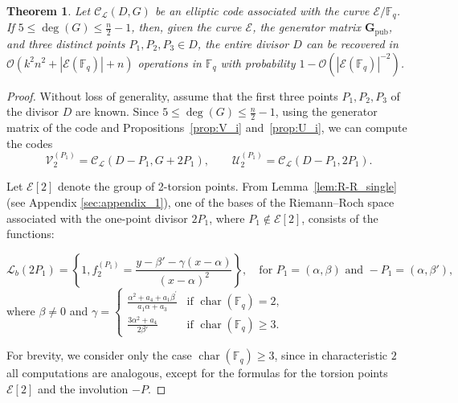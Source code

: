 \documentclass[sn-mathphys-num]{sn-jnl_modified}
\newcommand{\FF}{\ensuremath{\mathbb{F}}}
\newtheorem{theorem}{Theorem}[subsection]
\begin{document}
\begin{theorem}\label{th:my_attack_D}
Let $\mathcal{C}_\mathscr{L}(D, G)$ be an elliptic code associated with the curve $\mathcal{E}/\mathbb{F}_q$. If $5 \leq \deg(G) \leq \frac{n}{2}-1$, then, given the curve $\mathcal{E}$, the generator matrix $\mathbf{G}_{\operatorname{pub}}$, and three distinct points $P_1, P_2, P_3 \in D$, the entire divisor $D$ can be recovered in $\mathcal{O}\!\left(k^2n^2 + |\mathcal{E}(\mathbb{F}_q)| + n\right)$ operations in $\mathbb{F}_q$ with probability $1-\mathcal{O}\!\left(|\mathcal{E}(\FF_q)|^{-2}\right)$. 
\end{theorem}
\begin{proof}
Without loss of generality, assume that the first three points $P_1, P_2, P_3$ of the divisor $D$ are known. Since $5 \leq \deg(G) \leq \frac{n}{2}-1$, using the generator matrix of the code and Propositions~\ref{prop:V_i} and~\ref{prop:U_i}, we can compute the codes
\begin{equation}\label{eq:V2U2}
\mathcal{V}_2^{(P_1)} = \mathcal{C}_\mathscr{L}(D - P_1, G + 2P_1), \quad \quad \mathcal{U}_2^{(P_1)} = \mathcal{C}_\mathscr{L}(D - P_1, 2P_1).
\end{equation}

Let $\mathcal{E}[2]$ denote the group of 2-torsion points. From Lemma~\ref{lem:R-R_single} (see Appendix \ref{sec:appendix_1}), one of the bases of the Riemann--Roch space associated with the one-point divisor $2P_1$, where $P_1 \not\in \mathcal{E}[2]$, consists of the functions:


\begin{equation}\label{eq:U2_basis}
    \mathscr{L}_b(2P_1) = \left\{1, f_2^{(P_1)} = \frac{y - \beta' - \gamma(x - \alpha)}{(x-\alpha)^2}\right\}, \quad \text{for } P_1 = (\alpha, \beta) \text{ and } -P_1 = (\alpha, \beta'),
\end{equation}
where $\beta \neq 0$ and $\gamma = \begin{cases}
\frac{\alpha^2 + a_4 + a_1\beta^\prime}{a_1\alpha + a_3} & \text{if } \operatorname{char}(\mathbb{F}_q) = 2,\\[1.2ex]
\frac{3\alpha^2 + a_4}{2\beta'} & \text{if } \operatorname{char}(\mathbb{F}_q) \geq 3.
\end{cases}$

For brevity, we consider only the case $\operatorname{char}(\mathbb{F}_q) \geq 3$, since in characteristic $2$ all computations are analogous, except for the formulas for the torsion points $\mathcal{E}[2]$ and the involution $-P$.


\end{proof}
\end{document}
